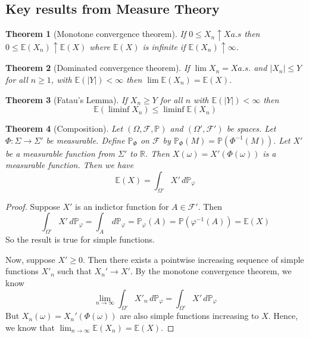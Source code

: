 \documentclass[10pt, oneside, reqno]{amsart}
\theoremstyle{plain}%
\newtheorem{thm}{Theorem}[section]
\theoremstyle{definition}
\theoremstyle{remark}
\renewcommand{\phi}{\varphi}
\newcommand{\sigf}{\mathcal{F}}
\newcommand{\R}{\mathbb{R}}
\newcommand{\E}{\mathbb{E}}
\renewcommand{\P}{\mathbb{P}}
\begin{document}
\subsection{Key results from Measure Theory} %
\label{sub:key_results_from_measure_theory}

\begin{thm}[Monotone convergence theorem]
    If $0 \leq X_n \uparrow X a.s$ then $0 \leq \E(X_n) \uparrow \E(X)$ where $\E(X)$ is infinite if $\E(X_n) \uparrow \infty$.
\end{thm}

\begin{thm}[Dominated convergence theorem]
    If $\lim X_n = X a.s.$ and $|X_n | \leq Y$ for all $n \geq 1$, with $\E(|Y|) < \infty$ then $\lim \E(X_n) = \E(X)$.
\end{thm}

\begin{thm}[Fatau's Lemma]
    If $X_n \geq Y$ for all $n$ with $\E(|Y|) < \infty$ then \[
        \E( \liminf X_n) \leq \liminf \E(X_n)
    \]
\end{thm}


\begin{thm}[Composition]
    Let $(\Omega, \sigf, \P)$ and $(\Omega', \sigf')$ be spaces.  Let $\Phi: \Sigma \rightarrow \Sigma'$ be measurable.  Define $\P_\Phi$ on $\sigf$ by $\P_\Phi(M) = \P(\Phi^{-1}(M))$.  Let $X'$ be a measurable function from $\Sigma'$ to $\R$.  Then $X(\omega) = X'(\Phi(\omega))$ is a measurable function.  Then we have 
    \[
        \E(X) = \int_{\Omega'} X' \, d\P_\phi
    \]
\end{thm}

\begin{proof}
    Suppose $X'$ is an indictor function for $A \in \sigf'$.  Then \[
        \int_{\Omega'} X' \, d\P_\phi = \int_A \, d\P_\phi = \P_\phi(A) = \P(\phi^{-1}(A)) = \E(X)
    \]
    So the result is true for simple functions.  
    
    Now, suppose $X' \geq 0$.  Then there exists a pointwise increasing sequence of simple functions $X'_n$ such that $X_n' \rightarrow X'$.  By the monotone convergence theorem, we know \[
        \lim_{n \rightarrow \infty} \int_{\Omega'} X'_n \, d\P_\phi = \int_{\Omega'} X' \, d\P_\phi
    \] 
    But $X_n(\omega) = X_n'(\Phi(\omega) )$ are also simple functions increasing to $X$.  Hence, we know that $\lim_{n \rightarrow \infty} \E(X_n) = \E(X)$.
\end{proof}
\end{document}
